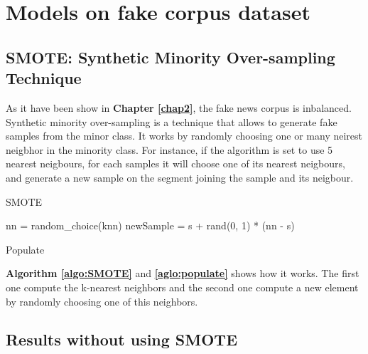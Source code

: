 \section{Models on fake corpus dataset}
\subsection{SMOTE: Synthetic Minority Over-sampling Technique\cite{Chawla2011}}
As it have been show in \textbf{Chapter \ref{chap2}}, the fake news corpus is inbalanced. Synthetic minority over-sampling is a technique that allows to generate fake samples from the minor class. It works by randomly choosing one or many neirest neigbhor in the minority class. For instance, if the algorithm is set to use 5 nearest neigbours, for each samples it will choose one of its nearest neigbours, and generate a new sample on the segment joining the sample and its neigbour. 

\begin{algorithm}
	 \caption{SMOTE}
	 \label{algo:SMOTE}
\end{algorithm}

\begin{algorithm}
	nn = random\_choice(knn)\;
	newSample = s + rand(0, 1) * (nn - s)\;
	\caption{Populate}
	\label{aglo:populate}
\end{algorithm}

\textbf{Algorithm \ref{algo:SMOTE}} and \textbf{\ref{aglo:populate}} shows how it works. The first one compute the k-nearest neighbors and the second one compute a new element by randomly choosing one of this neighbors. 

\subsection{Results without using SMOTE}